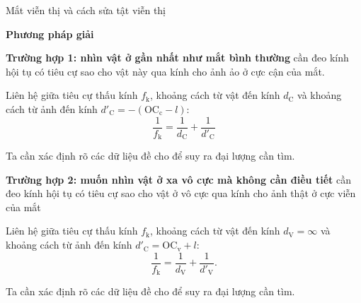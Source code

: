 \begin{dang}{Mắt viễn thị và cách sửa tật viễn thị}
\end{dang}
\textbf{Phương pháp giải}

\textbf{Trường hợp 1: nhìn vật ở gần nhất như mắt bình thường} cần đeo kính hội tụ có tiêu cự sao cho vật này qua kính cho ảnh ảo ở cực cận của mắt.

Liên hệ giữa tiêu cự thấu kính $f_\text{k}$, khoảng cách từ vật đến kính $d_\text{C}$ và khoảng cách từ ảnh đến kính $d'_\text{C}=-(\text{O}\text{C}_\text{c}-l)$:
$$\dfrac{1}{f_\text{k}}=\dfrac{1}{d_\text{C}}+\dfrac{1}{d'_\text{C}}$$

Ta cần xác định rõ các dữ liệu đề cho để suy ra đại lượng cần tìm.


\textbf{Trường hợp 2: muốn nhìn vật ở xa vô cực mà không cần điều tiết} cần đeo kính hội tụ có tiêu cự sao cho vật ở vô cực qua kính cho ảnh thật ở cực viễn của mắt 

Liên hệ giữa tiêu cự thấu kính $f_\text{k}$, khoảng cách từ vật đến kính $d_\text{V}=\infty$ và khoảng cách từ ảnh đến kính $d'_\text{C}=\text{O}\text{C}_\text{v}+l$:
$$\dfrac{1}{f_\text{k}}=\dfrac{1}{d_\text{V}}+\dfrac{1}{d'_\text{V}}.$$

Ta cần xác định rõ các dữ liệu đề cho để suy ra đại lượng cần tìm.





